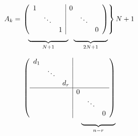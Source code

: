 \documentclass[12pt]{article}
\begin{document}
\begin{align*}
A_{k} &= \left.\left(
\begin{array}{ccc|ccc}
1 &  &  & 0\\
 & \ddots &  &  & \ddots\\
 &  & 1 &  &  & 0
\end{array}
\right)\right\}N+1\\[-0.5\normalbaselineskip]
      & \hspace{2em}\underbrace{\hspace{2cm}}_{N+1} 
        \hspace{\tabcolsep}
        \underbrace{\hspace{1.7cm}}_{2N+1}
 \end{align*}
 
\begin{align}
 	\left(\begin{array}{ccc|ccc}
 	d_1 &&&&&\\
 	& \ddots &&&& \\
 	& & d_r &&&\\
 	\hline
 	&&& 0&&\\
 	&&&& \ddots& \\
 	&&&&& 0
 	\end{array}\right)\\[-0.5\normalbaselineskip]
 	\underbrace{\hspace{1.7cm}}_{n-r}
\end{align}
 

 
\end{document}
